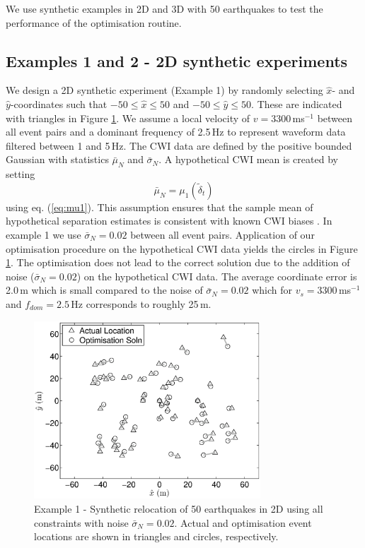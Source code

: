 \documentclass[extra]{gji}
\begin{document}
We use synthetic examples in 2D and 3D with 50 earthquakes to test
the performance of the optimisation routine.

\subsection{Examples 1 and 2 - 2D synthetic experiments}

We design a 2D synthetic experiment (Example 1) by randomly
selecting $\hat{x}$- and $\hat{y}$-coordinates such that $-50 \leq
\hat{x} \leq 50$ and $-50 \leq \hat{y} \leq 50$. These are indicated
with triangles in Figure \ref{fig-2D50eq-relocation_eg1}.
 We assume a local velocity of $v=3300\,$ms$^{-1}$ between all
event pairs and a dominant frequency of 2.5$\,$Hz to represent waveform data filtered between 1 and 5$\,$Hz.
The CWI data are defined by the positive bounded Gaussian with statistics
$\bar{\mu}_N$ and $\bar{\sigma}_N$. A hypothetical CWI mean is created by setting
\begin{equation}
\label{eq:hypothetical-CWI-mean-optichapt}
\bar{\mu}_N = \mu_1 \left( \widetilde{\delta}_t \right)
\end{equation}
using eq. (\ref{eq:mu1}). This assumption ensures that the sample
mean of hypothetical separation estimates is consistent with known
CWI biases \citep{dr_Robinson11a}. In example 1 we use
$\bar{\sigma}_N=0.02$ between all event pairs. Application of our
optimisation procedure on the hypothetical CWI data yields the
circles in Figure \ref{fig-2D50eq-relocation_eg1}. The optimisation
does not lead to the correct solution due to the addition of noise
($\bar{\sigma}_N=0.02$) on the hypothetical CWI data. The average
coordinate error is 2.0\,m which is small compared to the noise of
$\bar{\sigma}_N=0.02$ which for $v_s=3300$\,ms$^{-1}$ and
$f_{dom}=2.5$\,Hz corresponds to roughly 25\,m.
\begin{figure}
\includegraphics[width = 20pc]{diags/locs_2D_50eq_1.eps}
\caption{Example 1 - Synthetic relocation of 50 earthquakes in 2D
using all constraints with noise $\bar{\sigma}_N=0.02$. Actual and
optimisation event locations are shown in triangles and circles,
respectively.} \label{fig-2D50eq-relocation_eg1}
\end{figure}
\end{document}

